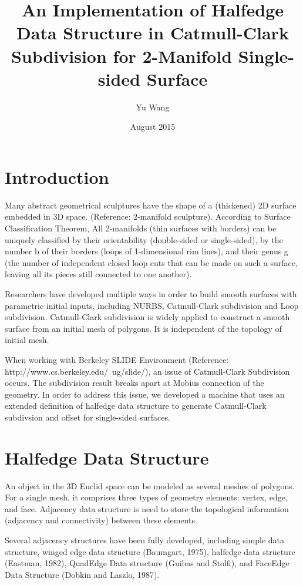 \documentclass[12pt]{article}
\title{An Implementation of Halfedge Data Structure in Catmull-Clark 
Subdivision for 2-Manifold Single-sided Surface}
\author{Yu Wang}
\date{August 2015}
\begin{document}
\maketitle
\newpage

\tableofcontents
\newpage
\section{Introduction}
Many abstract geometrical sculptures have the shape of a (thickened) 2D surface embedded in 3D space. (Reference: 2-manifold sculpture). According to Surface Classification Theorem, All 2-manifolds (thin surfaces with borders) can be uniquely classified by their orientability (double-sided or single-sided), by the number b of their borders (loops of 1-dimensional rim lines), and their genus g (the number of independent closed loop cuts that can be made on such a surface, leaving all its pieces still connected to one another).

Researchers have developed multiple ways in order to build smooth surfaces with parametric initial inputs, including NURBS, Catmull-Clark subdivision and Loop subdivision. Catmull-Clark subdivision is widely applied to construct a smooth surface from an initial mesh of polygons. It is independent of the topology of initial mesh.

When working with Berkeley SLIDE Environment (Reference: http://www.cs.berkeley.edu/~ug/slide/), an issue of Catmull-Clark Subdivision occurs. The subdivision result breaks apart at Mobius connection of the geometry. In order to address this issue, we developed a machine that uses an extended definition of halfedge data structure to generate Catmull-Clark subdivsion and offset for single-sided surfaces.

\newpage
\section{Halfedge Data Structure} \label{sec:halfedge}

An object in the 3D Euclid space can be modeled as several meshes of polygons. For a single mesh, it comprises three types of geometry elements: vertex, edge, and face. Adjacency data structure is need to store the topological information (adjacency and connectivity) between these elements.

Several adjacency structures have been fully developed, including simple data structure, winged edge data structure (Baumgart, 1975), halfedge data structure (Eastman, 1982), QuadEdge Data structure (Guibas and Stolfi), and FaceEdge Data Structure (Dobkin and Laszlo, 1987).
\end{document}
